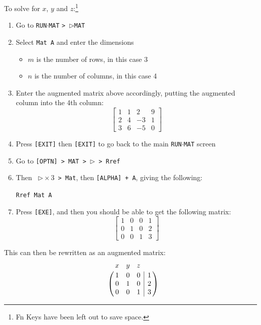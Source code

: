 \documentclass[a5paper]{memoir}
\def\VR{\kern-\arraycolsep\strut\vrule &\kern-\arraycolsep}
\def\vr{\kern-\arraycolsep & \kern-\arraycolsep}
\def\code#1{\texttt{#1}}
\def\runmat{\code{RUN$\cdot$MAT} }
\begin{document}
To solve for $x$, $y$ and $z$:\footnote{ Fn Keys have been left out to save space.}
\begin{enumerate}
	\item Go to \runmat \code{> $\triangleright$MAT}
	\item Select \code{Mat A} and enter the dimensions
	\begin{itemize}
		\item $m$ is the number of rows, in this case 3
		\item $n$ is the number of columns, in this case 4
	\end{itemize}
	\item Enter the augmented matrix above accordingly, putting the augmented column into the 4th column:
	\begin{equation*}
		\left[
			\begin{array}{cccc}
			1 & 1 & 2  & 9 \\  
			2 & 4 & -3 & 1 \\
			3 & 6 & -5 & 0
			\end{array}
		\right]
	\end{equation*}
	\item Press \code{[EXIT]} then \code{[EXIT]} to go back to the main \runmat screen
	\item Go to \code{[OPTN] > MAT > $\triangleright$ > Rref}
	\item Then \code{ $\triangleright \times 3$ > Mat}, then \code{[ALPHA] + A}, giving the following:
	\begin{center}
		\code{Rref Mat A}
	\end{center}
	\item Press \code{[EXE]}, and then you should be able to get the following matrix:
	\begin{equation*}
		\left[
			\begin{array}{cccc}
			1 & 0 & 0 & 1 \\  
			0 & 1 & 0 & 2 \\
			0 & 0 & 1 & 3
			\end{array}
		\right]
	\end{equation*}
\end{enumerate}

This can then be rewritten as an augmented matrix:
\begin{equation*}
\bordermatrix{  & x & y & z & \vr ~ \cr
			  ~ & 1 & 0 & 0 & \VR 1 \cr
			  ~ & 0 & 1 & 0 & \VR 2 \cr
			  ~ & 0 & 0 & 1 & \VR 3 }
\end{equation*}
\end{document}

